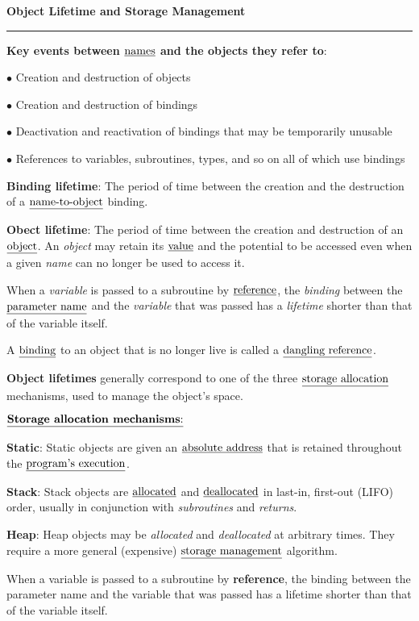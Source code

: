 \nopagenumbers
{\bf Object Lifetime and Storage Management}
\vskip 1mm
\hrule

\vskip 6pt
{\bf Key events between $\underline{\hbox{names}}$ and the objects they refer to}:

\vskip 6pt
$\bullet$ Creation and destruction of objects

\vskip 6pt
$\bullet$ Creation and destruction of bindings

\vskip 6pt
$\bullet$ Deactivation and reactivation of bindings that may be temporarily unusable

\vskip 6pt
$\bullet$ References to variables, subroutines, types, and so on all of which use bindings

\vskip 12pt
{\bf Binding lifetime}: The period of time between the creation and the destruction of a $\underline{\hbox{name-to-object}}$ binding.

\vskip 6pt
{\bf Obect lifetime}: The period of time between the creation and destruction of an $\underline{\hbox{object}}$. An {\it object} may retain its $\underline{\hbox{value}}$ and the potential to be accessed even when a given {\it name} can no longer be used to access it.

\vskip 1mm
When a {\it variable} is passed to a subroutine by $\underline{\hbox{reference}}$, the {\it binding} between the $\underline{\hbox{parameter name}}$ and the {\it variable} that was passed has a {\it lifetime} shorter than that of the variable itself.

\vskip 6pt
A $\underline{\hbox{binding}}$ to an object that is no longer live is called a $\underline{\hbox{dangling reference}}$.

\vskip 6pt
{\bf Object lifetimes} generally correspond to one of the three $\underline{\hbox{storage allocation}}$ mechanisms, used to manage the object's space.

\vskip 6pt
$\underline{\hbox{{\bf Storage allocation mechanisms}:}}$

\vskip 6pt
{\bf Static}: Static objects are given an $\underline{\hbox{absolute address}}$ that is retained throughout the $\underline{\hbox{program's execution}}$.

\vskip 6pt
{\bf Stack}: Stack objects are $\underline{\hbox{allocated}}$ and $\underline{\hbox{deallocated}}$ in last-in, first-out (LIFO) order, usually in conjunction with {\it subroutines} and {\it returns}.

\vskip 6pt
{\bf Heap}: Heap objects may be {\it allocated} and {\it deallocated} at arbitrary times. They require a more general (expensive) $\underline{\hbox{storage management}}$ algorithm.

\vskip 6pt
When a variable is passed to a subroutine by {\bf reference}, the binding between the parameter name and the variable that was passed has a lifetime shorter than that of the variable itself.


\vfill\eject
\bye
